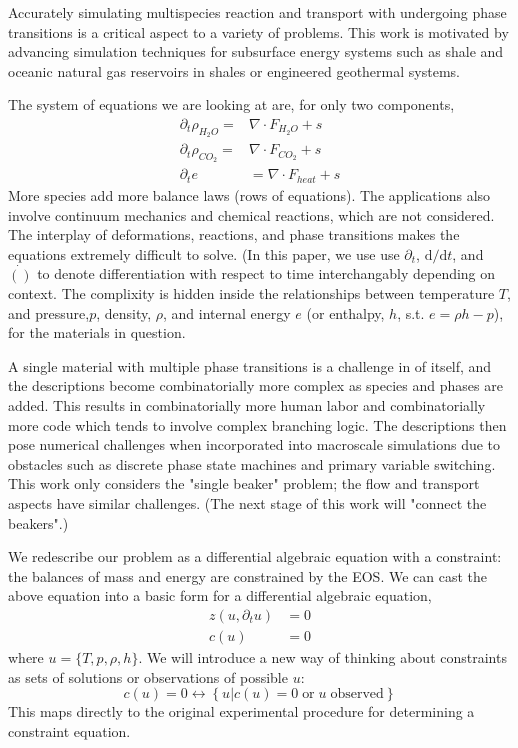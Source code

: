 \documentclass[]{article}
\begin{document}
Accurately simulating multispecies reaction and transport with
undergoing phase transitions is a critical aspect to a variety of
problems.
This work is motivated by advancing simulation techniques for subsurface energy systems such as shale
and oceanic natural gas reservoirs in shales or engineered geothermal
systems.


The system of equations we are looking at are, for only two components,
\begin{align}
  \partial_t \rho_{H_2O} =& \nabla \cdot F_{H_2O} + s \\
  \partial_t \rho_{CO_2} =& \nabla \cdot F_{CO_2} + s \\
  \partial_t e& = \nabla \cdot F_{heat} + s
\end{align}
More species add more balance laws (rows of equations). The applications also involve continuum
mechanics and chemical reactions, which are not considered. The interplay of deformations,
reactions, and phase transitions makes the equations extremely difficult
to solve. \cite{queiruga2018millstone}
(In this paper, we use use $\partial_t$, $\mathrm{d}/\mathrm{d}t$,
and $\dot{()}$ to denote differentiation with respect to time
interchangably depending on context.
The complixity is hidden inside the relationships between temperature
$T$, and pressure,$p$, density, $\rho$, and internal energy $e$ (or
enthalpy, $h$, s.t. $e=\rho h - p$), 
for the materials in question.


A single material with multiple phase transitions
is a challenge in of itself, and the descriptions become combinatorially
more complex as species and phases are added. This results in
combinatorially more human labor and combinatorially more code which
tends to involve complex branching logic. The descriptions then pose
numerical challenges when incorporated into macroscale simulations due
to obstacles such as discrete phase state machines and primary variable
switching.
This work only considers the "single beaker" problem; the flow
and transport aspects have similar challenges. (The next stage of this
work will "connect the beakers".)

We redescribe our problem as a differential algebraic equation
with a constraint: the balances of mass and energy are constrained by
the EOS. We can cast the above equation into a basic form for a
differential algebraic equation,
\begin{align}
  z( u, \partial_t u) &= 0 \\
  c(u) & = 0
\end{align}
where $u=\{T,p,\rho,h\}$. We will introduce a new way of thinking about constraints as sets of
solutions or observations of possible $u$:
\begin{equation}
c(u)=0 \leftrightarrow \left\{ u | c(u)=0 \;\text{or}\; u\; \text{observed} \right\}
\end{equation}
This maps directly to the original experimental procedure for
determining a constraint equation.
\end{document}
